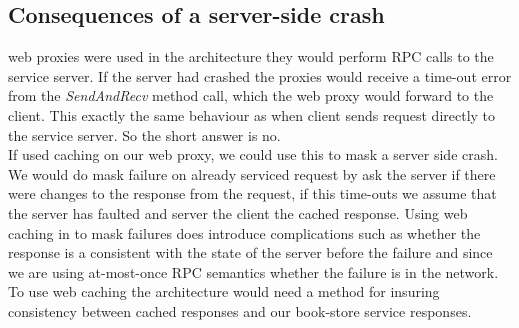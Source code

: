 \documentclass[a4paper]{article}
\begin{document}
\subsection{Consequences of a server-side crash}
web proxies were used in the architecture they would perform RPC calls to the service server. If the server had crashed the proxies would receive a time-out error from the \textit{SendAndRecv} method call, which the web proxy would forward to the client. This exactly the same behaviour as when client sends request directly to the service server. So the short answer is no.\\
If used caching on our web proxy, we could use this to mask a server side crash. We would do mask failure on already serviced request by ask the server if there were changes to the response from the request, if this time-outs we assume that the server has faulted and server the client the cached response. Using web caching in to mask failures does introduce complications such as whether the response is a consistent with the state of the server before the failure and since we are using at-most-once RPC semantics whether the failure is in the network.\\
To use web caching the architecture would need a method for insuring consistency between cached responses and our book-store service responses.
\end{document}
